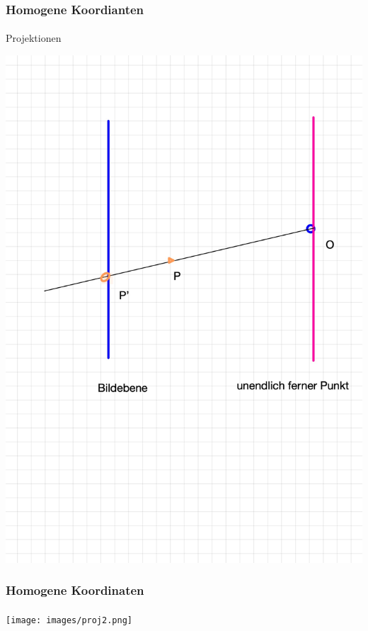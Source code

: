 \documentclass{beamer}
\begin{document}
\begin{frame}
    \frametitle{Homogene Koordianten}
\framesubtitle{}
    \begin{block}{Projektionen}
\begin{center}
\includegraphics[scale=0.15]{images/proj1}
\end{center}
\end{block}

\end{frame}




\begin{frame}
    \frametitle{Homogene Koordinaten}
\framesubtitle{}

\begin{center}
\texttt{[image: images/proj2.png]}
\end{center}
\end{frame}
\end{document}
